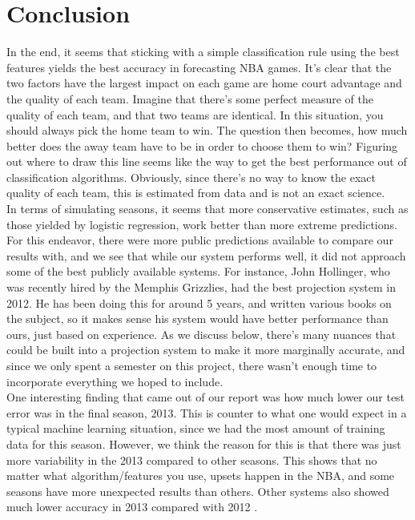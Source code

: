 \documentclass{article} %
\begin{document}
\section {Conclusion}
In the end, it seems that sticking with a simple classification rule using the best features yields the best accuracy in forecasting NBA games. It's clear that the two factors have the largest impact on each game are home court advantage and the quality of each team. Imagine that there's some perfect measure of the quality of each team, and that two teams are identical. In this situation, you should always pick the home team to win. The question then becomes, how much better does the away team have to be in order to choose them to win? Figuring out where to draw this line seems like the way to get the best performance out of classification algorithms. Obviously, since there's no way to know the exact quality of each team, this is estimated from data and is not an exact science. \\

In terms of simulating seasons, it seems that more conservative estimates, such as those yielded by logistic regression, work better than more extreme predictions. For this endeavor, there were more public predictions available to compare our results with, and we see that while our system performs well, it did not approach some of the best publicly available systems. For instance, John Hollinger, who was recently hired by the Memphis Grizzlies, had the best projection system in 2012. He has been doing this for around 5 years, and written various books on the subject, so it makes sense his system would have better performance than ours, just based on experience. As we discuss below, there's many nuances that could be built into a projection system to make it more marginally accurate, and since we only spent a semester on this project, there wasn't enough time to incorporate everything we hoped to include. \\

One interesting finding that came out of our report was how much lower our test error was in the final season, 2013. This is counter to what one would expect in a typical machine learning situation, since we had the most amount of training data for this season. However, we think the reason for this is that there was just more variability in the 2013 compared to other seasons. This shows that no matter what algorithm/features you use, upsets happen in the NBA, and some seasons have more unexpected results than others. Other systems also showed much lower accuracy in 2013 compared with 2012 \cite{projections}. \\ 
\end{document}
